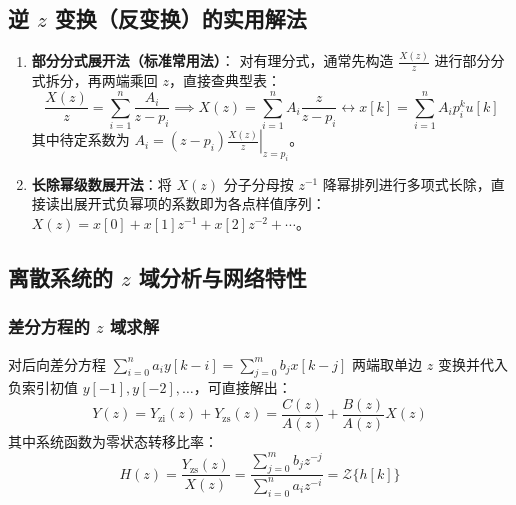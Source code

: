 \documentclass[11pt,a4paper,fontset=fandol]{ctexart}
\theoremstyle{remark}
\begin{document}
\subsection{逆 $z$ 变换（反变换）的实用解法}
\begin{enumerate}
    \item \textbf{部分分式展开法（标准常用法）}：
    对有理分式，通常先构造 $\frac{X(z)}{z}$ 进行部分分式拆分，再两端乘回 $z$，直接查典型表：
    \begin{equation}
        \frac{X(z)}{z} = \sum_{i=1}^n \frac{A_i}{z - p_i} \implies X(z) = \sum_{i=1}^n A_i \frac{z}{z - p_i} \longleftrightarrow x[k] = \sum_{i=1}^n A_i p_i^k u[k]
    \end{equation}
    其中待定系数为 $A_i = \left. (z - p_i)\frac{X(z)}{z} \right|_{z = p_i}$。
    \item \textbf{长除幂级数展开法}：将 $X(z)$ 分子分母按 $z^{-1}$ 降幂排列进行多项式长除，直接读出展开式负幂项的系数即为各点样值序列：$X(z) = x[0] + x[1]z^{-1} + x[2]z^{-2} + \cdots$。
\end{enumerate}

\subsection{离散系统的 $z$ 域分析与网络特性}

\subsubsection{差分方程的 $z$ 域求解}
对后向差分方程 $\sum_{i=0}^n a_i y[k - i] = \sum_{j=0}^m b_j x[k - j]$ 两端取单边 $z$ 变换并代入负索引初值 $y[-1], y[-2], \dots$，可直接解出：
\begin{equation}
    Y(z) = Y_{\mathrm{zi}}(z) + Y_{\mathrm{zs}}(z) = \frac{C(z)}{A(z)} + \frac{B(z)}{A(z)}X(z)
\end{equation}
其中系统函数为零状态转移比率：
\begin{equation}
    H(z) = \frac{Y_{\mathrm{zs}}(z)}{X(z)} = \frac{\sum_{j=0}^m b_j z^{-j}}{\sum_{i=0}^n a_i z^{-i}} = \mathcal{Z}\{h[k]\}
\end{equation}
\end{document}
